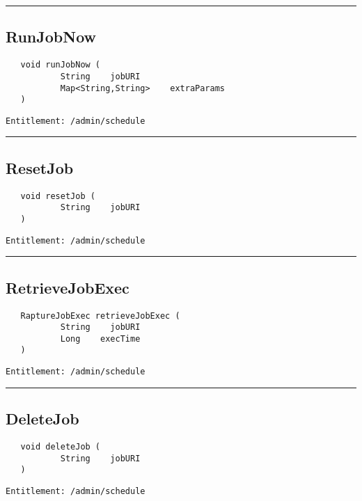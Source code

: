 \rule{12cm}{2pt}
\subsection{RunJobNow}
\label{Api:RunJobNow}
\begin{Verbatim}
   void runJobNow (
           String    jobURI
           Map<String,String>    extraParams
   )
\end{Verbatim}
\begin{Verbatim}[formatcom=\color{Maroon}]
  Entitlement: /admin/schedule
\end{Verbatim}



\rule{12cm}{2pt}
\subsection{ResetJob}
\label{Api:ResetJob}
\begin{Verbatim}
   void resetJob (
           String    jobURI
   )
\end{Verbatim}
\begin{Verbatim}[formatcom=\color{Maroon}]
  Entitlement: /admin/schedule
\end{Verbatim}



\rule{12cm}{2pt}
\subsection{RetrieveJobExec}
\label{Api:RetrieveJobExec}
\begin{Verbatim}
   RaptureJobExec retrieveJobExec (
           String    jobURI
           Long    execTime
   )
\end{Verbatim}
\begin{Verbatim}[formatcom=\color{Maroon}]
  Entitlement: /admin/schedule
\end{Verbatim}



\rule{12cm}{2pt}
\subsection{DeleteJob}
\label{Api:DeleteJob}
\begin{Verbatim}
   void deleteJob (
           String    jobURI
   )
\end{Verbatim}
\begin{Verbatim}[formatcom=\color{Maroon}]
  Entitlement: /admin/schedule
\end{Verbatim}



